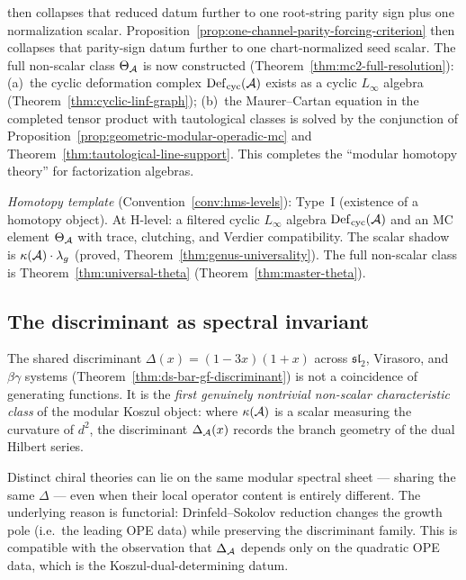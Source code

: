 \begin{remark}[Scope]
then collapses that reduced datum further to one root-string parity
sign plus one normalization scalar.
Proposition~\ref{prop:one-channel-parity-forcing-criterion}
then collapses that parity-sign datum further to one chart-normalized
seed scalar.
The full non-scalar class $\Theta_{\mathcal{A}}$ is now constructed
(Theorem~\ref{thm:mc2-full-resolution}): (a)~the cyclic
deformation complex $\operatorname{Def}_{\mathrm{cyc}}(\mathcal{A})$
exists as a cyclic $L_\infty$ algebra
(Theorem~\ref{thm:cyclic-linf-graph}); (b)~the Maurer--Cartan
equation in the completed tensor product with tautological classes
is solved by the conjunction of
Proposition~\ref{prop:geometric-modular-operadic-mc} and
Theorem~\ref{thm:tautological-line-support}.
This completes the ``modular homotopy theory'' for
factorization algebras.

\emph{Homotopy template} (Convention~\ref{conv:hms-levels}): Type~I
(existence of a homotopy object).  At H-level: a filtered cyclic $L_\infty$
algebra $\operatorname{Def}_{\mathrm{cyc}}(\mathcal{A})$ and an MC element $\Theta_{\mathcal{A}}$
with trace, clutching, and Verdier compatibility.  The scalar shadow is
$\kappa(\mathcal{A}) \cdot \lambda_g$ (proved, Theorem~\ref{thm:genus-universality}).
The full non-scalar class is Theorem~\ref{thm:universal-theta}
(Theorem~\ref{thm:master-theta}).
\end{remark}

\subsection{The discriminant as spectral invariant}

The shared discriminant $\Delta(x) = (1 - 3x)(1+x)$ across
$\mathfrak{sl}_2$, Virasoro, and $\beta\gamma$ systems
(Theorem~\ref{thm:ds-bar-gf-discriminant}) is not a coincidence
of generating functions.  It is the \emph{first genuinely
nontrivial non-scalar characteristic class} of the modular Koszul
object: where $\kappa(\mathcal{A})$ is a scalar measuring the curvature
of $d^2$, the discriminant $\Delta_{\mathcal{A}}(x)$ records the branch
geometry of the dual Hilbert series.

Distinct chiral theories can lie on the same modular spectral
sheet --- sharing the same $\Delta$ --- even when their local
operator content is entirely different.  The underlying reason
is functorial: Drinfeld--Sokolov reduction changes the growth pole
(i.e.\ the leading OPE data) while preserving the discriminant
family.  This is compatible with the observation that
$\Delta_{\mathcal{A}}$ depends only on the quadratic OPE data, which is
the Koszul-dual-determining datum.

